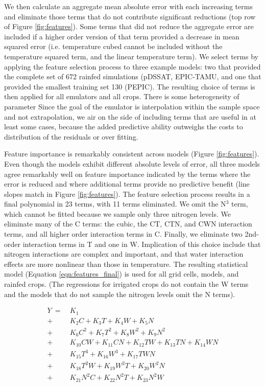 \documentclass[gmd, manuscript]{copernicus} %
\begin{document}
We then calculate an aggregate mean absolute error with each increasing terms and eliminate those terms that do not contribute significant reductions (top row of Figure \ref{fig:features}). 
Some terms that did not reduce the aggregate error are included if a higher order version of that term provided a decrease in mean squared error (i.e. temperature cubed cannot be included without the temperature squared term, and the linear temperature term). 
We select terms by applying the feature selection process to three example models: two that provided the complete set of 672 rainfed simulations (pDSSAT, EPIC-TAMU, and one that provided the smallest training set 130 (PEPIC). The resulting choice of terms is then applied for all emulators and all crops. 
There is some heterogeneity of parameter 
Since the goal of the emulator is interpolation within the sample space and not extrapolation, we air on the side of including terms that are useful in at least some cases, because the added predictive ability outweighs the costs to distribution of the residuals or over fitting.  

Feature importance is remarkably consistent across models (Figure \ref{fig:features}). 
Even though the models exhibit different absolute levels of error, all three models agree remarkably well on feature importance indicated by the terms where the error is reduced and where additional terms provide no predictive benefit (line slopes match in Figure \ref{fig:features}). 
The feature selection process results in a final polynomial in 23 terms, with 11 terms eliminated. 
We omit the N$^3$ term, which cannot be fitted because we sample only three nitrogen levels. 
We eliminate many of the C terms: the cubic, the CT, CTN, and CWN interaction terms, and all higher order interaction terms in C. 
Finally, we eliminate two 2nd-order interaction terms in T and one in W. 
Implication of this choice include that nitrogen interactions are complex and important, and that water interaction effects are more nonlinear than those in temperature. 
The resulting statistical model (Equation \ref{eqn:features_final}) is used for all grid cells, models, and rainfed crops. 
(The regressions for irrigated crops do not contain the W terms and the models that do not sample the nitrogen levels omit the N terms).

\begin{align}
    \label{eqn:features_final}
    Y\ = \ & K_{1}  \\
		+ \ & K_{2}  C     + K_{3}  T     + K_{4}  W     + K_{5}  N   \nonumber \\
		+ \ & K_{6}  C^2   + K_{7}  T^2   + K_{8}  W^2   + K_{9}  N^2 \nonumber \\
		+ \ & K_{10} C W   + K_{11} C N   + K_{12} T W   + K_{13} T N + K_{14} W N \nonumber \\ %
		+ \ & K_{15} T^3   + K_{16} W^3   + K_{17} T W N  \nonumber \\ %
		+ \ & K_{18} T^2 W + K_{19} W^2 T + K_{20} W^2 N  \nonumber \\ %
		+ \ & K_{21} N^2 C + K_{22} N^2 T + K_{23} N^2 W  \nonumber    %
\end{align}
\end{document}
